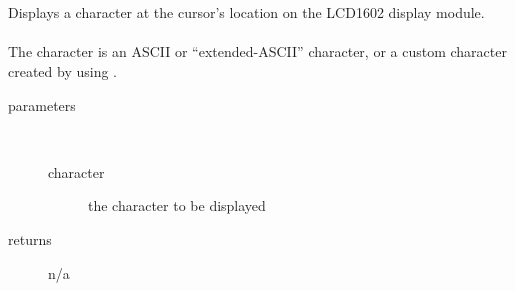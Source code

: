 \begin{itemize}
{             \\ \\
                Displays a character at the cursor's location on the LCD1602 display module. \\ \\
                The character is an ASCII or ``extended-ASCII'' character, or a custom character created by using .
                \begin{description}
                    \item[parameters] \
                    \begin{description}
                        \item[character] the character to be displayed
                    \end{description}
                    \item[returns] n/a
                \end{description}

}
\end{itemize}
